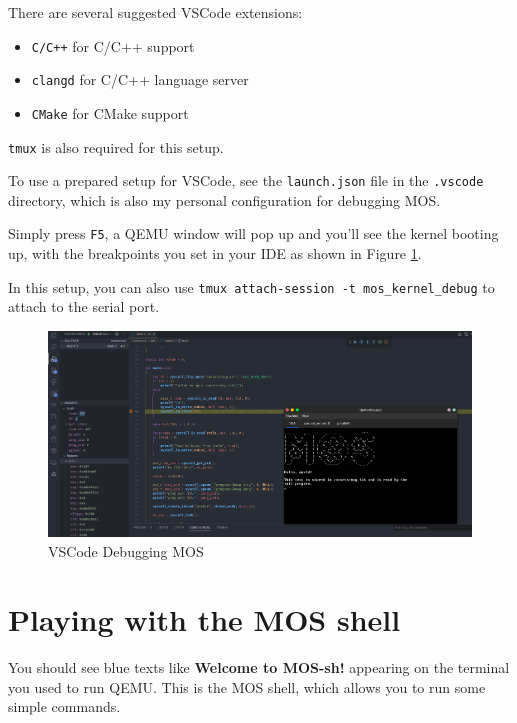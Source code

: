 \begin{tip}
    \item There are several suggested VSCode extensions:
    \begin{itemize}
        \item \texttt{C/C++} for C/C++ support
        \item \texttt{clangd} for C/C++ language server
        \item \texttt{CMake} for CMake support
    \end{itemize}
    \item \texttt{tmux} is also required for this setup.
\end{tip}

To use a prepared setup for VSCode, see the \texttt{launch.json} file in the \texttt{.vscode}
directory, which is also my personal configuration for debugging MOS.

Simply press \texttt{F5}, a QEMU window will pop up and you'll see the kernel booting up, with
the breakpoints you set in your IDE as shown in Figure \ref{fig:vscode-debugging}.

In this setup, you can also use \texttt{tmux attach-session -t mos\_kernel\_debug} to attach to the serial
port.

\begin{figure}[ht]
    \centering
    \includegraphics[width=\textwidth]{assets/c1.vscode-debugging.png}
    \caption{VSCode Debugging MOS}
    \label{fig:vscode-debugging}
\end{figure}

\section{Playing with the MOS shell}

You should see blue texts like \textbf{Welcome to MOS-sh!} appearing
on the terminal you used to run QEMU. This is the MOS shell, which allows
you to run some simple commands.

